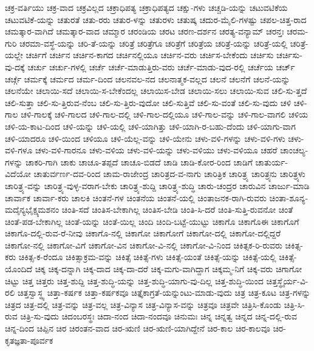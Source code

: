 {ಚಕ್ರ-ವರ್ತಿಯು
ಚಕ್ರ-ವಾದ
ಚಕ್ರವಿಲ್ಲದ
ಚಕ್ರಾಧಿಪತ್ಯ
ಚಕ್ರಾಧಿಪತ್ಯದ
ಚಕ್ಷು-ಗಳು
ಚಚ್ಚಡಿ-ಯನ್ನು
ಚಟುವಟಿಕೆಯ
ಚಟುವಟಿಕೆ-ಯನ್ನು
ಚತುರತೆ
ಚತು-ರರು
ಚತುರ-ಳನ್ನು
ಚತುರಳು
ಚತುಷ್ಕ
ಚದುರ-ಮೈಲಿ-ಗಳಷ್ಟು
ಚಪಲ-ಚಿತ್ತ-ರಾದ
ಚಮತ್ಕಾರ-ವಾಗಿದೆ
ಚಮತ್ಕಾರ-ವಾದ
ಚಮ್ಮಾರ
ಚರಂಡಿಯ
ಚರಟ
ಚರಣ-ದರ್ಶನ
ಚರತ್ಯ-ವನ್ಯಾಮ್
ಚರನ್ತಃ
ಚರಮ-ಗುರಿ
ಚರಮಾ-ವಸ್ಥೆ-ಯನ್ನು
ಚರಿ-ತೆ-ಯನ್ನು
ಚರಿತ್ರೆ
ಚರಿತ್ರೆಗೂ
ಚರಿತ್ರೆಗೆ
ಚರಿತ್ರೆಯ
ಚರಿತ್ರೆ-ಯನ್ನು
ಚರಿತ್ರೆ-ಯಲ್ಲಿ
ಚರಿತ್ರೆ-ಯಲ್ಲೇ
ಚರ್ಚಿಗೆ
ಚರ್ಚಿನ
ಚರ್ಚಿನ-ಕಾಗದ
ಚರ್ಚಿನಲ್ಲಿಯೂ
ಚರ್ಚಿನ-ವರು
ಚರ್ಚಿಸ-ಬೇಕೆಂದು
ಚರ್ಚಿಸು
ಚರ್ಚಿಸು-ವು-ದಕ್ಕೆ
ಚರ್ಚು
ಚರ್ಚು-ಗಳಲ್ಲಿ
ಚರ್ಚೆ
ಚರ್ಚೆ-ಮಾಡುತ್ತಿರು-ವರು
ಚರ್ಚೆ-ಮಾಡು-ವುದ-ರಲ್ಲಿ
ಚರ್ಚೆಯ
ಚರ್ಚ್
ಚರ್ಚ್ಗೆ
ಚರ್ಮಕ್ಕೆ
ಚರ್ಮದ
ಚರ್ಮ-ದಿಂದ
ಚಲನವಲ-ನದ
ಚಲನಾತ್ಮಕ-ವಲ್ಲದ
ಚಲನೆ
ಚಲನೆಗೆ
ಚಲನೆ-ಯನ್ನು
ಚಲನೆಯೇ
ಚಲಾಯಿ-ಸದೆ
ಚಲಾಯಿ-ಸ-ಬೇಕೆಂದಲ್ಲ
ಚಲಾಯಿಸ-ಬೇಡ
ಚಲಾಯಿ-ಸಲು
ಚಲಾಯಿ-ಸುವ
ಚಲಿ-ಸು-ತ್ತದೆ
ಚಲಿ-ಸುತ್ತಾ
ಚಲಿ-ಸು-ತ್ತಿರುವ-ನೆಂಬ
ಚಲಿ-ಸು-ತ್ತಿರು-ವುದೋ
ಚಲಿ-ಸುತ್ತಿವೆ
ಚಲಿ-ಸು-ವಂತೆ
ಚಲಿ-ಸು-ವುದು
ಚಳಿ
ಚಳಿ-ಗಾಲ
ಚಳಿ-ಗಾಲಕ್ಕೆ
ಚಳಿ-ಗಾಲದ
ಚಳಿ-ಗಾಲ-ದಲ್ಲಿ
ಚಳಿ-ಗಾಲ-ದಲ್ಲಿಯೂ
ಚಳಿ-ಗಾಲ-ವನ್ನು
ಚಳಿ-ಗಾಲ-ವಾಗಲಿ
ಚಳಿಯ
ಚಳಿ-ಯ-ಕಾಟ-ದಿಂದ
ಚಳಿ-ಯನ್ನು
ಚಳಿ-ಯಲ್ಲಿ
ಚಳಿ-ಯಾಗಿತ್ತು
ಚಳಿ-ಯಾಗಿ-ರ-ಬಹು-ದೆಂದು
ಚಳಿ-ಯಾಗು-ವಾಗ
ಚಳಿ-ಯಾದರೂ
ಚಳಿ-ಯಿಂದ
ಚಳಿಯೂ
ಚಳಿ-ಯೆಲ್ಲ-ವನ್ನು
ಚಳಿ-ಯೇನು
ಚಳು-ವಳಿ-ಗಳನ್ನು
ಚಳು-ವಳಿ-ಗಳು
ಚಳು-ವಳಿ-ಗಳೂ
ಚಳು-ವಳಿ-ಗಾರನೂ
ಚಳು-ವಳಿಯ
ಚಳು-ವಳಿ-ಯನ್ನು
ಚಳು-ವಳಿಯು
ಚಳು-ವಳಿಯೂ
ಚಹರೆ
ಚಾಂಚಲ್ಯ-ಗಳನ್ನು
ಚಾಕರಿ-ಗಾಗಿ
ಚಾಕು
ಚಾಚೂ-ತಪ್ಪದೆ
ಚಾಚೂ-ಬಿಡದೆ
ಚಾಡಿ
ಚಾಡಿ-ಕೋರ-ರಿಂದ
ಚಾಡಿಗೆ
ಚಾತುರ್ಯ-ವಿದೆಯೋ
ಚಾತುರ್ವರ್ಣ-ದವ-ರಿಂದ
ಚಾಮ-ರಾಜೇಂದ್ರ
ಚಾರಿತ್ರದ-ವ-ನಾಗು
ಚಾರಿತ್ರಿಕ
ಚಾರಿತ್ರ್ಯ
ಚಾರಿತ್ರ್ಯನು
ಚಾರಿತ್ರ್ಯಳು
ಚಾರಿತ್ರ್ಯ-ವನ್ನು
ಚಾರಿತ್ರ್ಯ-ವುಳ್ಳ-ವರಾಗ-ಬೇಕು
ಚಾರಿತ್ರ್ಯ-ಶುದ್ದಿ
ಚಾರಿತ್ರ್ಯ-ಶುದ್ಧಿ
ಚಾರು-ಚಂದ್ರರ
ಚಾರುವಿನ
ಚಾರ್ಜು-ಮಾಡಿ
ಚಾರ್ವಾಕ
ಚಾರ್ವಾ-ಕರು
ಚಾಲಕಿ
ಚಿಂತನೆ-ಗಳ
ಚಿಂತನೆಯ
ಚಿಂತನೆ-ಯಲ್ಲಿ
ಚಿಂತಾಜನಕ-ರಾಗಿ-ರುವರು
ಚಿಂತಾ-ಶೂನ್ಯ-ಮದೈನ್ಯಭೈಕ್ಷ್ಯಮಶನಂ
ಚಿಂತಿ-ಸದೆ
ಚಿಂತಿಸ-ಬೇಕಾಗಿಲ್ಲ
ಚಿಂತಿಸ-ಬೇಡಿ
ಚಿಂತಿ-ಸಿ-ದರೆ
ಚಿಂತಿ-ಸುತ್ತಿ-ರುವನೋ
ಚಿಂತೆ
ಚಿಂತೆ-ಪಡ-ಬೇಕಾಗಿಲ್ಲ
ಚಿಂತೆ-ಯನ್ನು
ಚಿಂತೆ-ಯಿಲ್ಲ
ಚಿಂದಿ
ಚಿಂದಿ-ಬಟ್ಟೆ-ಯುಟ್ಟು
ಚಿಕಾಗೊ
ಚಿಕಾಗೊಈ
ಚಿಕಾಗೊಗೆ
ಚಿಕಾಗೊ-ದಲ್ಲಿ-ರುವ-ರೆ-ನೀವು
ಚಿಕಾಗೊ-ನಲ್ಲಿ
ಚಿಕಾಗೋ
ಚಿಕಾಗೋಗೆ
ಚಿಕಾಗೋ-ದಲ್ಲಿ
ಚಿಕಾಗೋ-ದಲ್ಲಿದ್ದರೆ
ಚಿಕಾಗೋ-ನಲ್ಲಿ
ಚಿಕಾಗೋ-ವಿಗೆ
ಚಿಕಾಗೋ-ವಿನ
ಚಿಕಾಗೋ-ವಿ-ನಲ್ಲಿ
ಚಿಕಾಗೋ-ವಿ-ನಿಂದ
ಚಿಕಿತ್ಸಕ-ರಿ-ರುವರು
ಚಿಕಿತ್ಸ-ಕರು
ಚಿಕಿತ್ಸ-ಕ-ರೆಂದೂ
ಚಿಕಿತ್ಸಾಕ್ರಮ-ವನ್ನು
ಚಿಕಿತ್ಸೆ
ಚಿಕಿತ್ಸೆ-ಗಳು
ಚಿಕಿತ್ಸೆ-ಯಂತೆ
ಚಿಕಿತ್ಸೆ-ಯನ್ನು
ಚಿಕಿತ್ಸೆ-ಯಲ್ಲಿ
ಚಿಕಿತ್ಸೆ-ಯೊಂದಿದೆ
ಚಿಕ್ಕ
ಚಿಕ್ಕ-ದನ್ನಾಗಿ
ಚಿಕ್ಕ-ದಾದ
ಚಿಕ್ಕ-ದಾ-ದರೆ
ಚಿಕ್ಕ-ಮಗು-ವಾಗಿದ್ದಾಗ
ಚಿಕ್ಕಮ್ಮ-ನಿಗೆ
ಚಿಕ್ಕ-ವರು
ಚಿಗಾಗೋ
ಚಿಟ್ಟು
ಚಿತ್ತ
ಚಿತ್ತರು
ಚಿತ್ತ-ಶುದ್ದಿ
ಚಿತ್ತ-ಶುದ್ಧಿ-ಯನ್ನು
ಚಿತ್ತ-ಶುದ್ಧಿ-ಯಾಗು-ವು-ದಿಲ್ಲ
ಚಿತ್ತ-ಶುದ್ಧಿ-ಯಿಂದ
ಚಿತ್ತಸ್ಥೈರ್ಯ-ವಿ-ರಲಿ
ಚಿತ್ತಸ್ವಾಸ್ಥ್ಯ
ಚಿತ್ತಾ-ಕರ್ಷಕ
ಚಿತ್ತಾ-ಕರ್ಷಕವೂ
ಚಿತ್ತೈಕಾಗ್ರತೆ-ಯನ್ನುಂಟು-ಮಾಡು-ವುದು
ಚಿತ್ರ
ಚಿತ್ರ-ಕೂಟ
ಚಿತ್ರ-ಗಳನ್ನು
ಚಿತ್ರದ
ಚಿತ್ರ-ದಲ್ಲಿ
ಚಿತ್ರ-ವನ್ನು
ಚಿತ್ರ-ವಲ್ಲ
ಚಿತ್ರ-ವಿನ್ಯಾಸ
ಚಿತ್ರ-ವಿನ್ಯಾಸ-ವನ್ನು
ಚಿತ್ರವೂ
ಚಿತ್ರವೇ
ಚಿತ್ರಿಸಿ-ಕೊಂಡು
ಚಿತ್ರಿ-ಸಿ-ರುವ
ಚಿತ್ರಿ-ಸು-ವುದು
ಚಿದಂಬರಸ್ಥಃ
ಚಿದಾ-ನಂದ
ಚಿದಾ-ನಂದವೂ
ಚಿನುಮಃ
ಚಿನ್ನ
ಚಿನ್ನತ್ವ
ಚಿನ್ನದ
ಚಿನ್ನ-ದಲ್ಲಿ-ರುವ
ಚಿನ್ನ-ದಿಂದ
ಚಿಪ್ಪಿನ
ಚಿರ
ಚಿರಂತನ-ವಾದ
ಚಿರ-ಋಣಿ
ಚಿರ-ಋಣಿ-ಯಾಗಿದ್ದೇನೆ
ಚಿರ-ಕಾಲ
ಚಿರ-ಕಾಲವೂ
ಚಿರ-ಕೃತಜ್ಞತಾ-ಪೂರ್ವಕ
}
